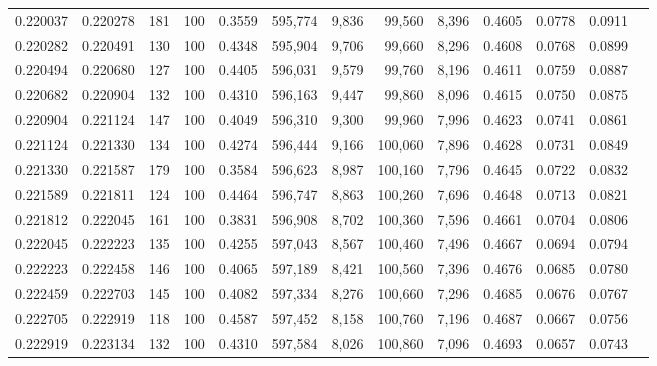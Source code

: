 \begin{tabular}{rrrrrrrrrrrrr}
0.220037 & 0.220278 &   181 & 100 &                                     0.3559 & 595,774 &   9,836 &  99,560 &   8,396 & 0.4605 & 0.0778 & 0.0911 \\
0.220282 & 0.220491 &   130 & 100 &                                     0.4348 & 595,904 &   9,706 &  99,660 &   8,296 & 0.4608 & 0.0768 & 0.0899 \\
0.220494 & 0.220680 &   127 & 100 &                                     0.4405 & 596,031 &   9,579 &  99,760 &   8,196 & 0.4611 & 0.0759 & 0.0887 \\
0.220682 & 0.220904 &   132 & 100 &                                     0.4310 & 596,163 &   9,447 &  99,860 &   8,096 & 0.4615 & 0.0750 & 0.0875 \\
0.220904 & 0.221124 &   147 & 100 &                                     0.4049 & 596,310 &   9,300 &  99,960 &   7,996 & 0.4623 & 0.0741 & 0.0861 \\
0.221124 & 0.221330 &   134 & 100 &                                     0.4274 & 596,444 &   9,166 & 100,060 &   7,896 & 0.4628 & 0.0731 & 0.0849 \\
0.221330 & 0.221587 &   179 & 100 &                                     0.3584 & 596,623 &   8,987 & 100,160 &   7,796 & 0.4645 & 0.0722 & 0.0832 \\
0.221589 & 0.221811 &   124 & 100 &                                     0.4464 & 596,747 &   8,863 & 100,260 &   7,696 & 0.4648 & 0.0713 & 0.0821 \\
0.221812 & 0.222045 &   161 & 100 &                                     0.3831 & 596,908 &   8,702 & 100,360 &   7,596 & 0.4661 & 0.0704 & 0.0806 \\
0.222045 & 0.222223 &   135 & 100 &                                     0.4255 & 597,043 &   8,567 & 100,460 &   7,496 & 0.4667 & 0.0694 & 0.0794 \\
0.222223 & 0.222458 &   146 & 100 &                                     0.4065 & 597,189 &   8,421 & 100,560 &   7,396 & 0.4676 & 0.0685 & 0.0780 \\
0.222459 & 0.222703 &   145 & 100 &                                     0.4082 & 597,334 &   8,276 & 100,660 &   7,296 & 0.4685 & 0.0676 & 0.0767 \\
0.222705 & 0.222919 &   118 & 100 &                                     0.4587 & 597,452 &   8,158 & 100,760 &   7,196 & 0.4687 & 0.0667 & 0.0756 \\
0.222919 & 0.223134 &   132 & 100 &                                     0.4310 & 597,584 &   8,026 & 100,860 &   7,096 & 0.4693 & 0.0657 & 0.0743 \\

\end{tabular}
